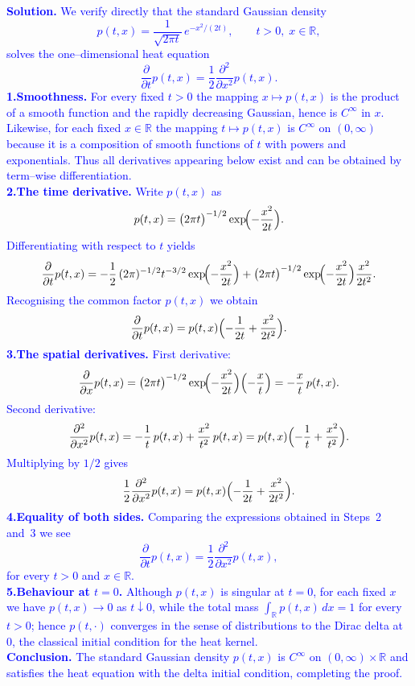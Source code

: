 \documentclass{article}
\begin{document}
\textcolor{blue}{
\textbf{Solution.} We verify directly that the standard Gaussian density
$$
p(t,x)=\frac{1}{\sqrt{2\pi t}}\,e^{-x^{2}/(2t)},\qquad t>0,\;x\in\mathbb{R},
$$
solves the one–dimensional heat equation
$$
\frac{\partial}{\partial t}p(t,x)=\frac12\frac{\partial^{2}}{\partial x^{2}}p(t,x).
$$
\textbf{1.\;Smoothness.}
For every fixed \(t>0\) the mapping \(x\mapsto p(t,x)\) is the product of a smooth function and the rapidly decreasing Gaussian, hence is \(C^{\infty}\) in \(x\).
Likewise, for each fixed \(x\in\mathbb{R}\) the mapping \(t\mapsto p(t,x)\) is \(C^{\infty}\) on \((0,\infty)\) because it is a composition of smooth functions of \(t\) with powers and exponentials.
Thus all derivatives appearing below exist and can be obtained by term–wise differentiation. \\
\textbf{2.\;The time derivative.}
Write \(p(t,x)\) as
$$
p(t,x)=\bigl(2\pi t\bigr)^{-1/2}\exp\!\Bigl(-\frac{x^{2}}{2t}\Bigr).
$$
Differentiating with respect to \(t\) yields
$$
\frac{\partial}{\partial t}p(t,x)
=
-\frac12\,(2\pi)^{-1/2}t^{-3/2}\exp\!\Bigl(-\frac{x^{2}}{2t}\Bigr)
+\bigl(2\pi t\bigr)^{-1/2}\exp\!\Bigl(-\frac{x^{2}}{2t}\Bigr)\frac{x^{2}}{2t^{2}}.
$$
Recognising the common factor \(p(t,x)\) we obtain
$$
\frac{\partial}{\partial t}p(t,x)=p(t,x)\Bigl(-\frac1{2t}+\frac{x^{2}}{2t^{2}}\Bigr).
$$
\textbf{3.\;The spatial derivatives.}
First derivative:
$$
\frac{\partial}{\partial x}p(t,x)
=
\bigl(2\pi t\bigr)^{-1/2}\exp\!\Bigl(-\frac{x^{2}}{2t}\Bigr)\Bigl(-\frac{x}{t}\Bigr)
=
-\frac{x}{t}\,p(t,x).
$$
Second derivative:
$$
\frac{\partial^{2}}{\partial x^{2}}p(t,x)
=
-\frac1{t}\,p(t,x)+\frac{x^{2}}{t^{2}}\,p(t,x)
=
p(t,x)\Bigl(-\frac1{t}+\frac{x^{2}}{t^{2}}\Bigr).
$$
Multiplying by \(1/2\) gives
$$
\frac12\frac{\partial^{2}}{\partial x^{2}}p(t,x)
=
p(t,x)\Bigl(-\frac1{2t}+\frac{x^{2}}{2t^{2}}\Bigr).
$$
\textbf{4.\;Equality of both sides.}
Comparing the expressions obtained in Steps 2 and 3 we see
$$
\frac{\partial}{\partial t}p(t,x)=\frac12\frac{\partial^{2}}{\partial x^{2}}p(t,x),
$$
for every \(t>0\) and \(x\in\mathbb{R}\). \\
\textbf{5.\;Behaviour at \(t=0\).}
Although \(p(t,x)\) is singular at \(t=0\), for each fixed \(x\) we have
\(p(t,x)\to0\) as \(t\downarrow0\), while the total mass
\(\int_{\mathbb{R}}p(t,x)\,dx=1\) for every \(t>0\); hence \(p(t,\cdot)\) converges in the sense of distributions to the Dirac delta at \(0\),
the classical initial condition for the heat kernel. \\
\textbf{Conclusion.} The standard Gaussian density \(p(t,x)\) is \(C^{\infty}\) on \((0,\infty)\times\mathbb{R}\) and satisfies the heat equation with the delta initial condition, completing the proof.
}
\end{document}
